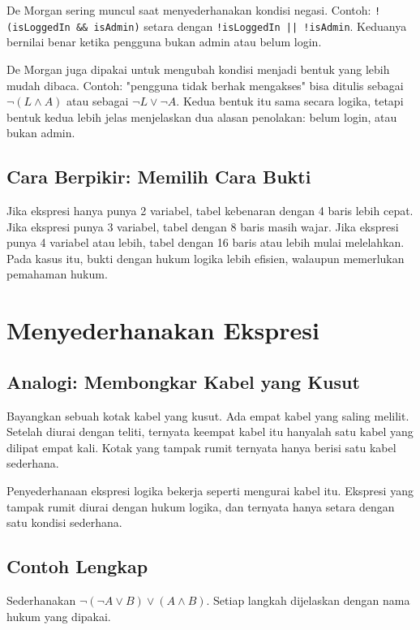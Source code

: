 \documentclass[11pt,a4paper]{article}
\begin{document}
De Morgan sering muncul saat menyederhanakan kondisi negasi. Contoh: \texttt{!(isLoggedIn \&\& isAdmin)} setara dengan \texttt{!isLoggedIn || !isAdmin}. Keduanya bernilai benar ketika pengguna bukan admin atau belum login.

De Morgan juga dipakai untuk mengubah kondisi menjadi bentuk yang lebih mudah dibaca. Contoh: "pengguna tidak berhak mengakses" bisa ditulis sebagai $\neg(L \wedge A)$ atau sebagai $\neg L \vee \neg A$. Kedua bentuk itu sama secara logika, tetapi bentuk kedua lebih jelas menjelaskan dua alasan penolakan: belum login, atau bukan admin.

\subsection{Cara Berpikir: Memilih Cara Bukti}

Jika ekspresi hanya punya 2 variabel, tabel kebenaran dengan 4 baris lebih cepat. Jika ekspresi punya 3 variabel, tabel dengan 8 baris masih wajar. Jika ekspresi punya 4 variabel atau lebih, tabel dengan 16 baris atau lebih mulai melelahkan. Pada kasus itu, bukti dengan hukum logika lebih efisien, walaupun memerlukan pemahaman hukum.

\section{Menyederhanakan Ekspresi}

\subsection{Analogi: Membongkar Kabel yang Kusut}

Bayangkan sebuah kotak kabel yang kusut. Ada empat kabel yang saling melilit. Setelah diurai dengan teliti, ternyata keempat kabel itu hanyalah satu kabel yang dilipat empat kali. Kotak yang tampak rumit ternyata hanya berisi satu kabel sederhana.

Penyederhanaan ekspresi logika bekerja seperti mengurai kabel itu. Ekspresi yang tampak rumit diurai dengan hukum logika, dan ternyata hanya setara dengan satu kondisi sederhana.

\subsection{Contoh Lengkap}

Sederhanakan $\neg(\neg A \vee B) \vee (A \wedge B)$. Setiap langkah dijelaskan dengan nama hukum yang dipakai.
\end{document}
